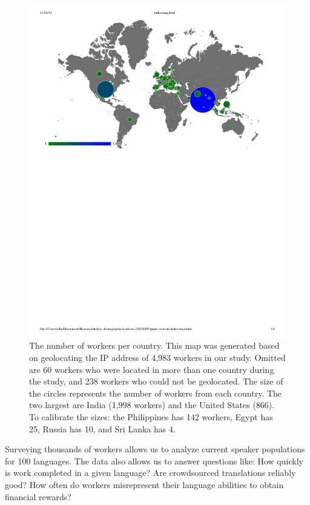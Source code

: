 \documentclass[11pt]{article}
\begin{document}
\begin{figure}[h]
\centering
\includegraphics[width=\linewidth]{figures/map.pdf}
\caption{The number of workers per country.  This map was generated based on geolocating the IP address of  4,983 workers in our study.  Omitted are 60 workers who were located in more than one country during the study, and 238 workers who could not be geolocated. The size of the circles represents the number of workers from each country.  The two largest are India (1,998 workers) and the United States (866).  To calibrate the sizes: the Philippines has 142 workers, Egypt has 25, Russia has 10, and Sri Lanka has 4.}
\label{map}
\end{figure}


Surveying thousands of workers allows us to analyze current speaker populations for 100 languages.  The data also allows us to answer questions like: 
How quickly is work completed in a given language? 
Are crowdsourced translations reliably good? 
How often do workers misrepresent their language abilities to obtain financial rewards? 
\end{document}
